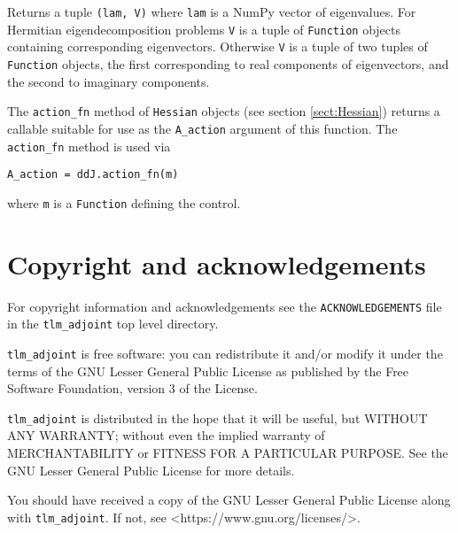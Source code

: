 \documentclass[11pt]{article}
\begin{document}
Returns a tuple \texttt{(lam, V)} where \texttt{lam} is a NumPy vector of
eigenvalues. For Hermitian eigendecomposition problems \texttt{V} is a tuple of
\texttt{Function} objects containing corresponding eigenvectors. Otherwise
\texttt{V} is a tuple of two tuples of \texttt{Function} objects, the first
corresponding to real components of eigenvectors, and the second to imaginary
components.

The \texttt{action\_fn} method of \texttt{Hessian} objects (see section
\ref{sect:Hessian}) returns a callable suitable for use as the
\texttt{A\_action} argument of this function. The \texttt{action\_fn} method is
used via
\begin{lstlisting}
A_action = ddJ.action_fn(m)
\end{lstlisting}
where \texttt{m} is a \texttt{Function} defining the control.

\section{Copyright and acknowledgements}

For copyright information and acknowledgements see the
\texttt{ACKNOWLEDGEMENTS} file in the \texttt{tlm\_adjoint} top level
directory.

\texttt{tlm\_adjoint} is free software: you can redistribute it and/or modify
it under the terms of the GNU Lesser General Public License as published by
the Free Software Foundation, version 3 of the License.

\texttt{tlm\_adjoint} is distributed in the hope that it will be useful,
but WITHOUT ANY WARRANTY; without even the implied warranty of
MERCHANTABILITY or FITNESS FOR A PARTICULAR PURPOSE.  See the
GNU Lesser General Public License for more details.

You should have received a copy of the GNU Lesser General Public License
along with \texttt{tlm\_adjoint}.  If not, see {\textless}https://www.gnu.org/licenses/{\textgreater}.



\end{document}
